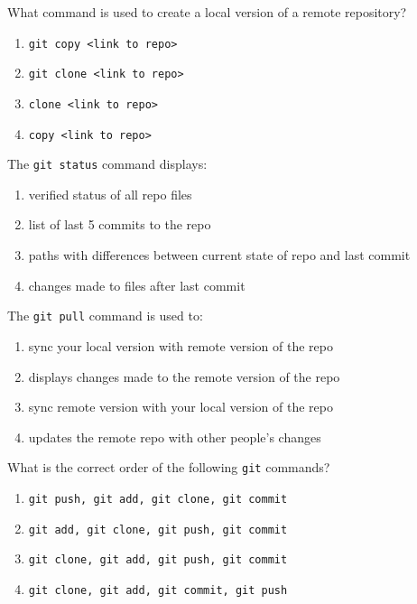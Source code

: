\documentclass[12pt,fleqn]{examtst}
\begin{document}

\renewcommand{\labelenumi}{\Alph{enumi}.}


\noindent
\begin{minipage}{\textwidth}

What command is used to create a local version of a remote repository?

\begin{enumerate}
    \item \lstinline{git copy <link to repo>}
    \item \lstinline{git clone <link to repo>}
    \item \lstinline{clone <link to repo>}
    \item \lstinline{copy <link to repo>}
\end{enumerate}

The \lstinline{git status} command displays:

\begin{enumerate}
    \item verified status of all repo files
    \item list of last 5 commits to the repo
    \item paths with differences between current state of repo and last commit
    \item changes made to files after last commit
\end{enumerate}

The \lstinline{git pull} command is used to:

\begin{enumerate}
    \item sync your local version with remote version of the repo
    \item displays changes made to the remote version of the repo
    \item sync remote version with your local version of the repo
    \item updates the remote repo with other people's changes
\end{enumerate}

What is the correct order of the following \lstinline{git} commands?

\begin{enumerate}
    \item \lstinline{git push, git add, git clone, git commit}
    \item \lstinline{git add, git clone, git push, git commit}
    \item \lstinline{git clone, git add, git push, git commit}
    \item \lstinline{git clone, git add, git commit, git push}
\end{enumerate}

\end{minipage}
\end{document}
